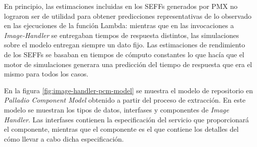 En principio, las estimaciones incluidas en los SEFFs generados por PMX no lograron ser de utilidad para obtener predicciones representativas de lo observado en las ejecuciones de la función Lambda: mientras que en las invocaciones a \emph{Image-Handler} se entregaban tiempos de respuesta distintos, las simulaciones sobre el modelo entregan siempre un dato fijo. Las estimaciones de rendimiento de los SEFFs se basaban en tiempos de cómputo constantes lo que hacía que el motor de simulaciones generara una predicción del tiempo de respuesta que era el mismo para todos los casos.

En la figura \ref{fig:image-handler-pcm-model} se muestra el modelo de repositorio en \emph{Palladio Component Model} obtenido a partir del proceso de extracción. En este modelo se muestran los tipos de datos, interfases y componentes de \emph{Image Handler}. Las interfases contienen la especificación del servicio que proporcionará el componente, mientras que el componente es el que contiene los detalles del cómo llevar a cabo dicha especificación.






%    
%

